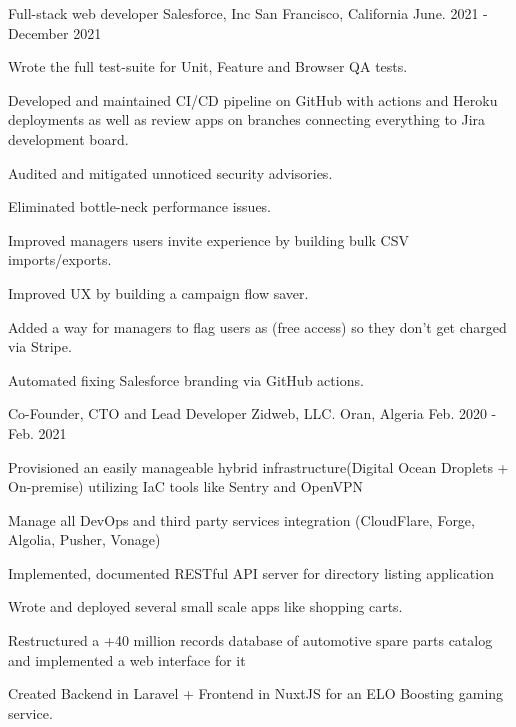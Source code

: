 \begin{cventries}
  \cventry
    {Full-stack web developer} %
    {Salesforce, Inc} %
    {San Francisco, California} %
    {June. 2021 - December 2021} %
    {
      \begin{cvitems} %
        \item {Wrote the full test-suite for Unit, Feature and Browser QA tests.}
        \item {Developed and maintained CI/CD pipeline on GitHub with actions and Heroku deployments as well as review apps on branches connecting everything to Jira development board.}
        \item {Audited and mitigated unnoticed security advisories.}
        \item {Eliminated bottle-neck performance issues.}
        \item {Improved managers users invite experience by building bulk CSV imports/exports.}
        \item {Improved UX by building a campaign flow saver.}
        \item {Added a way for managers to flag users as (free access) so they don't get charged via Stripe.}
        \item {Automated fixing Salesforce branding via GitHub actions.}
      \end{cvitems}
     }

  \cventry
    {Co-Founder, CTO and Lead Developer} %
    {Zidweb, LLC.} %
    {Oran, Algeria} %
    {Feb. 2020 - Feb. 2021} %
    {
      \begin{cvitems} %
        \item {Provisioned an easily manageable hybrid infrastructure(Digital Ocean Droplets + On-premise) utilizing IaC tools like Sentry and OpenVPN}
        \item {Manage all DevOps and third party services integration (CloudFlare, Forge, Algolia, Pusher, Vonage)}
        \item {Implemented, documented RESTful API server for directory listing application}
        \item {Wrote and deployed several small scale apps like shopping carts.}
        \item {Restructured a +40 million records database of automotive spare parts catalog and implemented a web interface for it}
        \item {Created Backend in Laravel + Frontend in NuxtJS for an ELO Boosting gaming service.}
      \end{cvitems}
    }


\end{cventries}
